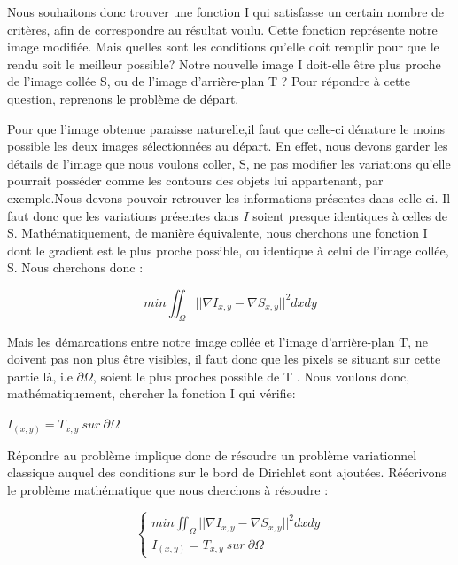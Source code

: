 Nous souhaitons donc trouver une fonction I qui satisfasse un certain nombre de critères, afin de correspondre au résultat voulu.  
Cette fonction représente notre image modifiée. Mais quelles sont les conditions qu'elle doit remplir pour que le rendu soit le meilleur possible? Notre nouvelle image I doit-elle être plus proche de l'image collée S, ou de l'image d'arrière-plan T ? \newline
Pour répondre à cette question, reprenons le problème de départ. \newline

Pour que l'image obtenue paraisse naturelle,il faut que celle-ci dénature le moins possible les deux images sélectionnées au départ. En effet, nous devons garder les détails de l'image que nous voulons coller, S, ne pas modifier les variations qu'elle pourrait posséder comme les contours des objets lui appartenant, par exemple.Nous devons pouvoir retrouver les informations présentes dans celle-ci. Il faut donc que les variations présentes dans $I$ soient presque identiques à celles de S. Mathématiquement, de manière équivalente, nous cherchons une fonction I dont le gradient est le plus proche possible, ou identique à celui de l'image collée, S. Nous cherchons donc :
\begin{center}
    $$ min \iint_\Omega || \nabla I_{x,y} - \nabla S_{x,y}||^2 dxdy$$
\end{center} 

Mais les démarcations entre notre image collée et l'image d'arrière-plan T, ne doivent pas non plus être visibles, il faut donc que les pixels se situant sur cette partie là, i.e $\partial \Omega$, soient le plus proches possible de T .  Nous voulons donc, mathématiquement, chercher la fonction I qui vérifie: 
\begin{center}
    $I_{(x,y)} = T_{x,y} \ sur\ \partial \Omega$
\end{center}

Répondre au problème implique donc de résoudre un problème variationnel classique auquel des conditions sur le bord de Dirichlet sont ajoutées. 
Réécrivons le problème mathématique que nous cherchons à résoudre :  

\begin{center}
\begin{equation*}
\left\{
\begin{aligned}
 min \iint_\Omega || \nabla I_{x,y} - \nabla S_{x,y}||^2 dxdy\\
 I_{(x,y)} = T_{x,y} \ sur\ \partial \Omega
\end{aligned}
\right.
\end{equation*}
\end{center}


